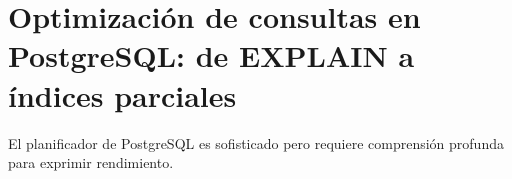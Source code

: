 \section*{Optimización de consultas en PostgreSQL: de EXPLAIN a índices parciales}

El planificador de PostgreSQL es sofisticado pero requiere comprensión profunda para exprimir rendimiento.
